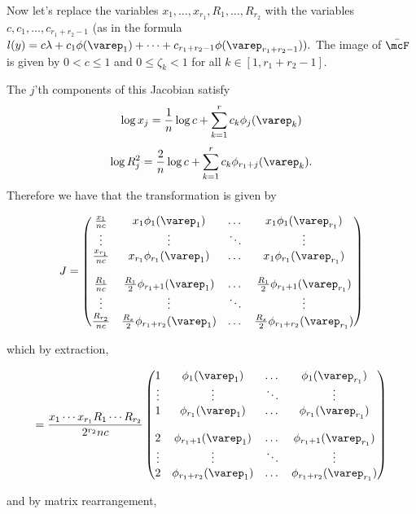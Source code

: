 \documentclass[a4paper, 12pt,oneside,openany]{book}
\begin{document}
Now let's replace the variables $x_1, \dots, x_{r_1}, R_1, \dots, R_{r_2}$ with the variables $c, c_1, \dots, c_{r_1+r_2-1}$ (as in the formula $l(y)=c\lambda+c_1 \phi(\varep_1)+\dots+c_{r_1+r_2-1} \phi(\varep_{r_1+r_2-1})).$ The image of $\bar{\mcF}$ is given by $0<c \leq 1$ and $0 \leq \zeta_k < 1$ for all $k\in [1, r_1+r_2-1]$. 

The $j$'th components of this Jacobian satisfy $$\log x_j = \frac{1}{n} \log c + \sum\limits_{k=1}^r c_k \phi_j(\varep_k)$$ $$\log R_j^2 = \frac{2}{n} \log c + \sum\limits_{k=1}^r c_k \phi_{r_1+j}(\varep_k).$$ Therefore we have that the transformation is given by 


$$J=\begin{pmatrix}
        \frac{x_1}{nc} & x_1\phi_1(\varep_1) & \dots & x_1\phi_1(\varep_{r_1}) \\
        \vdots & \vdots & \ddots & \vdots \\
        \frac{x_{r_1}}{nc} & x_{r_1}\phi_{r_1}(\varep_1) & \dots & x_1\phi_{r_1}(\varep_{r_1}) \\ \\
        \frac{R_1}{nc} & \frac{R_1}{2} \phi_{r_1+1}(\varep_1) & \dots & \frac{R_1}{2} \phi_{r_1+1}(\varep_{r_1}) \\
        \vdots & \vdots & \ddots & \vdots \\
        \frac{R_{r_2}}{nc} & \frac{R_s}{2} \phi_{r_1+r_2}(\varep_1) & \dots & \frac{R_s}{2} \phi_{r_1+r_2}(\varep_{r_1}) 
   	\end{pmatrix} $$
	
which by extraction,
	
$$=\frac{x_1\cdots x_{r_1} R_1 \cdots R_{r_2}}{2^{r_2} nc}\begin{pmatrix}
        1 & \phi_1(\varep_1) & \dots & \phi_1(\varep_{r_1}) \\
        \vdots & \vdots & \ddots & \vdots \\
        1 & \phi_{r_1}(\varep_1) & \dots & \phi_{r_1}(\varep_{r_1}) \\ \\
        2 &  \phi_{r_1+1}(\varep_1) & \dots & \phi_{r_1+1}(\varep_{r_1}) \\
        \vdots & \vdots & \ddots & \vdots \\
        2 & \phi_{r_1+r_2}(\varep_1) & \dots &  \phi_{r_1+r_2}(\varep_{r_1}) 
   	\end{pmatrix}$$
	
and by matrix rearrangement,
\end{document}
